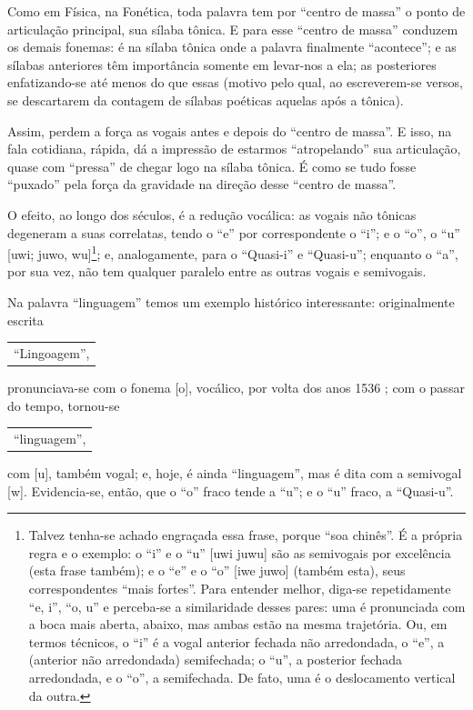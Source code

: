 \documentclass[12pt, a5paper, titlepage]{article}
\begin{document}
Como em Física, na Fonética, toda palavra tem por ``centro de massa'' o ponto de articulação principal, sua sílaba tônica. E para esse ``centro de massa'' conduzem os demais fonemas: é na sílaba tônica onde a palavra finalmente ``acontece''; e as sílabas anteriores têm importância somente em levar-nos a ela; as posteriores  enfatizando-se até menos do que essas (motivo pelo qual, ao escreverem-se versos, se descartarem da contagem de sílabas poéticas aquelas após a tônica).

Assim, perdem a força as vogais antes e depois do ``centro de massa''. E isso, na fala cotidiana, rápida, dá a impressão de estarmos ``atropelando'' sua articulação, quase com ``pressa'' de chegar logo na sílaba tônica. É como se tudo fosse ``puxado'' pela força da gravidade na direção desse ``centro de massa''.

O efeito, ao longo dos séculos, é a redução vocálica: as vogais não tônicas degeneram a suas correlatas, tendo o ``e'' por correspondente o ``i''; e o ``o'', o ``u'' [u\textprimstress wi; ju\textprimstress wo, wu]\footnote{
    Talvez tenha-se achado engraçada essa frase, porque ``soa chinês''. É a própria regra e o exemplo: o ``i'' e o ``u'' [u\textprimstress wi ju\textprimstress wu] são as semivogais por excelência (esta frase também); e o ``e'' e o ``o'' [iw\textprimstress e ju\textprimstress wo] (também esta), seus correspondentes ``mais fortes''. Para entender melhor, diga-se repetidamente ``e, i'', ``o, u'' e perceba-se a similaridade desses pares: uma é pronunciada com a boca mais aberta, abaixo, mas ambas estão na mesma trajetória. Ou, em termos técnicos, o ``i'' é a vogal anterior fechada não arredondada, o ``e'', a (anterior não arredondada) semifechada; o ``u'', a posterior fechada arredondada, e o ``o'', a semifechada. De fato, uma é o deslocamento vertical da outra.
}; e, analogamente, para o ``Quasi-i'' e ``Quasi-u''; enquanto o ``a'', por sua vez, não tem qualquer paralelo entre as outras vogais e semivogais.

Na palavra ``linguagem'' temos um exemplo histórico interessante: originalmente escrita
\begin{center}
    \begin{tabular}{l}
        ``Lingoagem'',
    \end{tabular}
\end{center}
pronunciava-se com o fonema [o], vocálico, por volta dos anos 1536%
; com o passar do tempo, tornou-se
\begin{center}
    \begin{tabular}{l}
        ``linguagem'',
    \end{tabular}
\end{center}
com [u], também vogal; e, hoje, é ainda ``linguagem'', mas é dita com a semivogal [w]. Evidencia-se, então, que o ``o'' fraco tende a ``u''; e o ``u'' fraco, a ``Quasi-u''.
\end{document}
